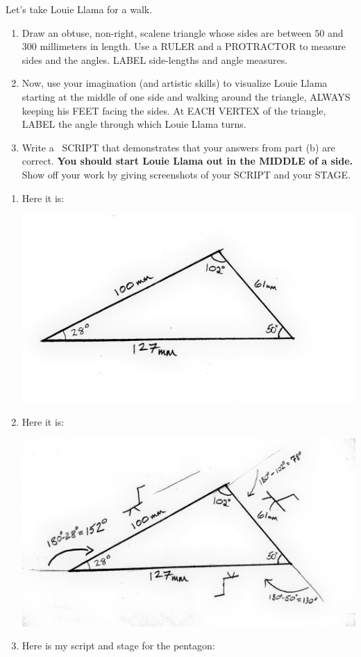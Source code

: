 \documentclass[nooutcomes,noauthor,handout]{ximera}
\begin{document}
\begin{question}
  Let's take Louie Llama for a walk.
  \begin{enumerate}
  \item Draw an obtuse, non-right, scalene triangle whose sides are
    between $50$ and $300$ millimeters in length. Use a RULER and a
    PROTRACTOR to measure sides and the angles. LABEL side-lengths and
    angle measures.
  \item Now, use your imagination (and artistic skills) to visualize
    Louie Llama starting at the middle of one side and walking around
    the triangle, ALWAYS keeping his FEET facing the sides. At EACH
    VERTEX of the triangle, LABEL the angle through which Louie Llama
    turns.
  \item Write a \snap\ SCRIPT that demonstrates that your answers from
    part (b) are correct. \textbf{You should start Louie Llama out in the
    MIDDLE of a side.}  Show off your work by giving screenshots of
    your SCRIPT and your STAGE.
  \end{enumerate}
  \begin{freeResponse}
    \begin{enumerate}
    \item Here it is:
      \begin{center}
        \includegraphics[width=.4\textwidth]{specificTri.jpg}
      \end{center}
    \item Here it is:
      \begin{center}
        \includegraphics[width=.4\textwidth]{llamaAndSpecificTri.jpg}
      \end{center}
    \item Here is my script and stage for the pentagon:
      \begin{center}

\end{center}
\end{enumerate}
\end{freeResponse}
\end{question}
\end{document}
